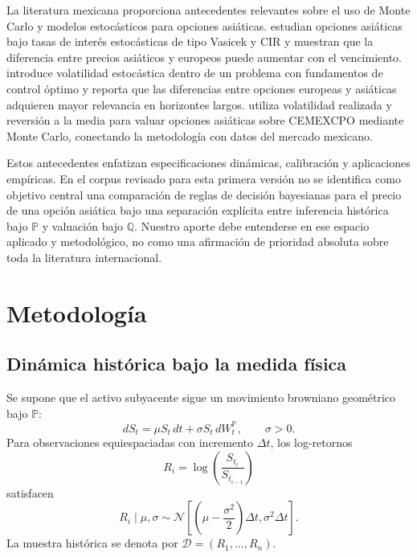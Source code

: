 \documentclass[12pt,letterpaper]{article}
\newcommand{\Pmeasure}{\mathbb{P}}
\newcommand{\Qmeasure}{\mathbb{Q}}
\begin{document}
La literatura mexicana proporciona antecedentes relevantes sobre el uso de Monte Carlo y modelos estocásticos para opciones asiáticas. \citet{ortiz2016} estudian opciones asiáticas bajo tasas de interés estocásticas de tipo Vasicek y CIR y muestran que la diferencia entre precios asiáticos y europeos puede aumentar con el vencimiento. \citet{matias2019} introduce volatilidad estocástica dentro de un problema con fundamentos de control óptimo y reporta que las diferencias entre opciones europeas y asiáticas adquieren mayor relevancia en horizontes largos. \citet{ortizjimenez2026} utiliza volatilidad realizada y reversión a la media para valuar opciones asiáticas sobre CEMEXCPO mediante Monte Carlo, conectando la metodología con datos del mercado mexicano.

Estos antecedentes enfatizan especificaciones dinámicas, calibración y aplicaciones empíricas. En el corpus revisado para esta primera versión no se identifica como objetivo central una comparación de reglas de decisión bayesianas para el precio de una opción asiática bajo una separación explícita entre inferencia histórica bajo $\Pmeasure$ y valuación bajo $\Qmeasure$. Nuestro aporte debe entenderse en ese espacio aplicado y metodológico, no como una afirmación de prioridad absoluta sobre toda la literatura internacional.

\section{Metodología}

\subsection{Dinámica histórica bajo la medida física}

Se supone que el activo subyacente sigue un movimiento browniano geométrico bajo $\Pmeasure$:
\begin{equation}
 dS_t=\mu S_t\,dt+\sigma S_t\,dW_t^{\Pmeasure},
 \qquad \sigma>0.
 \label{eq:p_gbm}
\end{equation}
Para observaciones equiespaciadas con incremento $\Delta t$, los log-retornos
\begin{equation}
 R_i=\log\left(\frac{S_{t_i}}{S_{t_{i-1}}}\right)
\end{equation}
satisfacen
\begin{equation}
 R_i\mid\mu,\sigma
 \sim
 \mathcal N\!\left[
 \left(\mu-\frac{\sigma^2}{2}\right)\Delta t,
 \sigma^2\Delta t
 \right].
 \label{eq:logreturns}
\end{equation}
La muestra histórica se denota por $\mathcal D=(R_1,\ldots,R_n)$.
\end{document}
